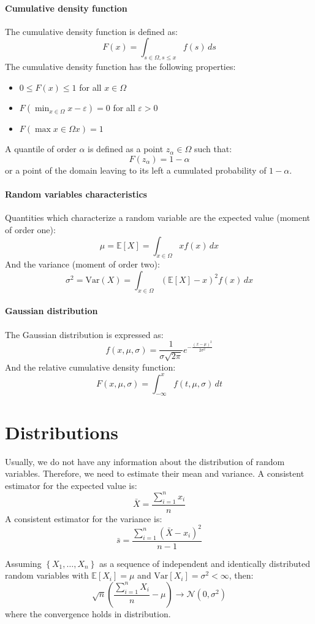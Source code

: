 \paragraph*{Cumulative density function}
The cumulative density function is defined as:
\[F(x)=\int_{s \in \Omega, s \leq x}f(s)\,ds\]
The cumulative density function has the following properties:
\begin{itemize}
    \item $0 \leq F(x)\leq 1$ for all $x \in \Omega$
    \item $F\left(\min_{x \in \Omega}x-\varepsilon\right)=0$ for all $\varepsilon>0$
    \item $F\left(\max{x \in \Omega}x\right)=1$
\end{itemize}
A quantile of order $\alpha$ is defined as a point $z_\alpha \in \Omega$ such that: 
\[F(z_\alpha)=1-\alpha\]
or a point of the domain leaving to its left a cumulated probability of $1-\alpha$. 

\paragraph*{Random variables characteristics}
Quantities which characterize a random variable are the expected value (moment of order one):
\[\mu=\mathbb{E}\left[X\right]=\int_{x \in \Omega}xf(x)\,dx\]
And the variance (moment of order two):
\[\sigma^2=\text{Var}(X)=\int_{x \in \Omega}{\left(\mathbb{E}\left[X\right]-x\right)}^2f(x)\,dx\]

\paragraph*{Gaussian distribution}
The Gaussian distribution is expressed as:
\[f(x,\mu,\sigma)=\dfrac{1}{\sigma\sqrt{2\pi}}e^{-\frac{{(x-\mu)}^2}{2\sigma^2}}\]
And the relative cumulative density function:
\[F(x,\mu,\sigma)=\int_{-\infty}^{x}f(t,\mu,\sigma)\,dt\]

\section{Distributions}
Usually, we do not have any information about the distribution of random variables. 
Therefore, we need to estimate their mean and variance.
A consistent estimator for the expected value is:
\[\bar{X}=\dfrac{\sum_{i=1}^{n}x_i}{n}\]
A consistent estimator for the variance is:
\[\bar{s}=\dfrac{\sum_{i=1}^{n}{\left(\bar{X}-x_i\right)}^2}{n-1}\]

\begin{theorem}
    Assuming $\left\{X_1,\dots,X_n\right\}$ as a sequence of independent and identically distributed random variables with $\mathbb{E}\left[X_i\right]=\mu$ and $\text{Var}\left[X_i\right]=\sigma^2<\infty$, then: 
    \[\sqrt{n}\left( \dfrac{\sum_{i=1}^{n}X_i}{n}-\mu\right)\rightarrow\mathcal{N}(0,\sigma^2)\]
    where the convergence holds in distribution.
\end{theorem}